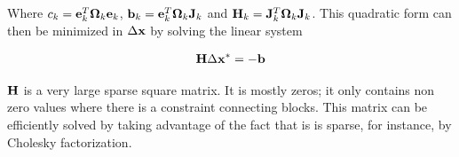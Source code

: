 Where $c_k = \mathbf e_k^T \mathbf \Omega_k \mathbf e_k$, $\mathbf b_k = \mathbf e_k^T \mathbf \Omega_k \mathbf J_k$ and $\mathbf H_k = \mathbf J_k^T \mathbf \Omega_k \mathbf J_k$. This quadratic form can then be minimized in $\Delta \mathbf x$ by solving the linear system

\begin{align}
   \mathbf H \Delta \mathbf x^* = -\mathbf b
\end{align}

$\mathbf H$ is a very large sparse square matrix.  It is mostly zeros; it only contains non zero values where there is a constraint connecting blocks.  This matrix can be efficiently solved by taking advantage of the fact that is is sparse, for instance, by Cholesky factorization.
